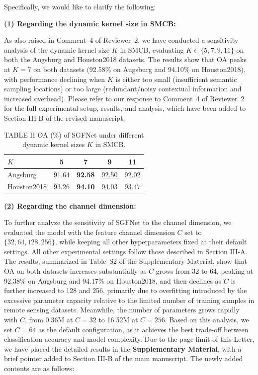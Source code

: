 Specifically, we would like to clarify the following:

\textbf{(1) Regarding the dynamic kernel size in SMCB:}

As also raised in Comment~4 of Reviewer~2, we have conducted a sensitivity analysis of the dynamic kernel size $K$ in SMCB, evaluating $K \in \{5, 7, 9, 11\}$ on both the Augsburg and Houston2018 datasets. The results show that OA peaks at $K=7$ on both datasets (92.58\% on Augsburg and 94.10\% on Houston2018), with performance declining when $K$ is either too small (insufficient semantic sampling locations) or too large (redundant/noisy contextual information and increased overhead). Please refer to our response to Comment~4 of Reviewer~2 for the full experimental setup, results, and analysis, which have been added to Section III-B of the revised manuscript.

\begin{table}[h]
  \centering
  \small
  \caption*{TABLE II OA (\%) of SGFNet under different dynamic kernel sizes $K$ in SMCB.}
  \begin{tabular}{lcccc}
  \toprule
  $K$ & 5 & 7 & 9 & 11 \\
  \midrule
  Augsburg    & 91.64 & \textbf{92.58} & \underline{92.50} & 92.02 \\
  Houston2018 & 93.26 & \textbf{94.10} & \underline{94.03} & 93.47 \\
  \bottomrule
  \end{tabular}
\end{table}

\textbf{(2) Regarding the channel dimension:}

To further analyze the sensitivity of SGFNet to the channel dimension, we evaluated the model with the feature channel dimension $C$ set to $\{32, 64, 128, 256\}$, while keeping all other hyperparameters fixed at their default settings. All other experimental settings follow those described in Section III-A. The results, summarized in Table~S2 of the Supplementary Material, show that OA on both datasets increases substantially as $C$ grows from 32 to 64, peaking at 92.38\% on Augsburg and 94.17\% on Houston2018, and then declines as $C$ is further increased to 128 and 256, primarily due to overfitting introduced by the excessive parameter capacity relative to the limited number of training samples in remote sensing datasets. Meanwhile, the number of parameters grows rapidly with $C$, from 0.36M at $C=32$ to 16.52M at $C=256$. Based on this analysis, we set $C=64$ as the default configuration, as it achieves the best trade-off between classification accuracy and model complexity. Due to the page limit of this Letter, we have placed the detailed results in the \textbf{Supplementary Material}, with a brief pointer added to Section III-B of the main manuscript. The newly added contents are as follows:


